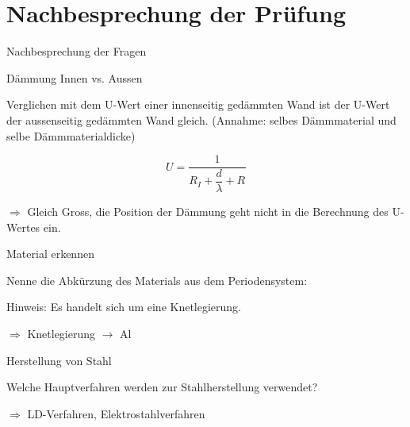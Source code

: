 \section{Nachbesprechung der Prüfung}
\BlueSectionSlide


\begin{frame}{Nachbesprechung der Fragen}

\end{frame}

\begin{frame}{Dämmung Innen vs. Aussen
	}
	\begin{Fragenblock}
			
	Verglichen mit dem U-Wert einer innenseitig gedämmten Wand ist der U-Wert der aussenseitig
	gedämmten Wand gleich. (Annahme: selbes Dämmmaterial und selbe Dämmmaterialdicke)
	
	\begin{equation*}
		U  = \frac{1}{R_{I} + \dfrac{d}{\lambda} + R_{}}
	\end{equation*}
	
	\end{Fragenblock}
	\pause
	\vspace{1cm}

	$\Rightarrow$ Gleich Gross, die Position der Dämmung geht nicht in die Berechnung des U-Wertes ein.

\end{frame}

\begin{frame}{Material erkennen}

	\begin{Fragenblock}
		Nenne die Abkürzung des Materials aus dem Periodensystem:

Hinweis: Es handelt sich um eine Knetlegierung.
	\end{Fragenblock}
	\pause
	\vspace{1cm}
	$\Rightarrow$ Knetlegierung $ \rightarrow $ Al

\end{frame}

\begin{frame}{Herstellung von Stahl}
	\begin{Fragenblock}
		Welche Hauptverfahren werden zur Stahlherstellung verwendet?
	\end{Fragenblock}
	\pause
	\vspace{1cm}
	$\Rightarrow$ LD-Verfahren, Elektrostahlverfahren

\end{frame}


